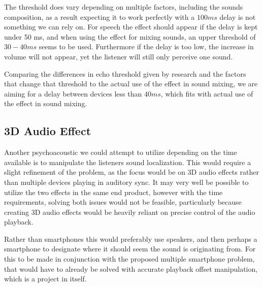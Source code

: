 The threshold does vary depending on multiple factors, including the sounds composition, as a result expecting it to work perfectly with a $100 ms$ delay is not something we can rely on.
For speech the effect should appear if the delay is kept under 50 ms, and when using the effect for mixing sounds, an upper threshold of $30 - 40 ms$ seems to be used.
Furthermore if the delay is too low, the increase in volume will not appear, yet the listener will still only perceive one sound.\cite{useprecedence1, useprecedence2, useprecedence3}

Comparing the differences in echo threshold given by research and the factors that change that threshold to the actual use of the effect in sound mixing, we are aiming for a delay between devices less than $40 ms$, which fits with actual use of the effect in sound mixing.

\subsection{3D Audio Effect}
Another psychoacoustic we could attempt to utilize depending on the time available is to manipulate the listeners sound localization.
This would require a slight refinement of the problem, as the focus would be on 3D audio effects rather than multiple devices playing in auditory sync.
It may very well be possible to utilize the two effects in the same end product, however with the time requirements, solving both issues would not be feasible, particularly because creating 3D audio effects would be heavily reliant on precise control of the audio playback.

Rather than smartphones this would preferably use speakers, and then perhaps a smartphone to designate where it should seem the sound is originating from.
For this to be made in conjunction with the proposed multiple smartphone problem, that would have to already be solved with accurate playback offset manipulation, which is a project in itself.
